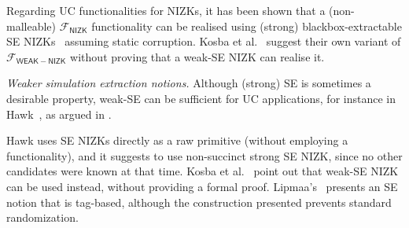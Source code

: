 \documentclass[a4paper, 9pt]{article}
\begin{document}
Regarding UC functionalities for NIZKs, it has been shown that a (non-malleable)
$\mathcal{F}_{\mathsf{NIZK}}$ functionality can be realised using (strong)
blackbox-extractable SE NIZKs~\cite{canetti2002universally, groth2006simulation}
assuming static corruption.
%
Kosba et al.~\cite{kosba2015use,kosba2015c} suggest their own variant of
$\mathcal{F}_{\mathsf{WEAK-NIZK}}$ without proving that a weak-SE NIZK
can realise it.\smallskip

\noindent\emph{Weaker simulation extraction notions.} Although
(strong) SE is sometimes a desirable property, weak-SE can be
sufficient for UC applications, for instance in
Hawk~\cite{kosba2016hawk}, as argued in \cite{kosba2015use,kosba2015c}.

Hawk uses SE NIZKs directly as a raw primitive
(without employing a functionality), and it suggests to use
non-succinct strong SE NIZK, since no other candidates were known at that
time. Kosba et al.~\cite{kosba2015use,kosba2015c} point out that
weak-SE NIZK can be used instead, without providing a formal proof.
%
%
Lipmaa's~\cite{lip19} presents an SE notion that is tag-based, although the
construction presented prevents standard randomization.

\printbibliography
\end{document}
